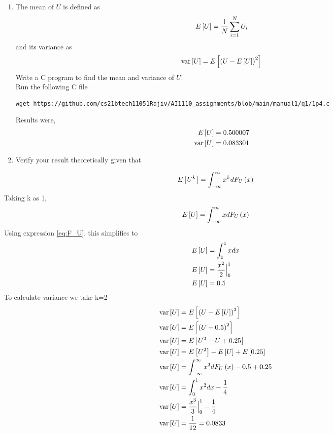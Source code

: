 \documentclass[journal,12pt,twocolumn]{IEEEtran}
\renewcommand\thesection{\arabic{section}}
\begin{document}
\begin{enumerate}[label=\thesection.\arabic*
,ref=\thesection.\theenumi]
\begin{figure}
    \caption{The CDF of $U$}
    \label{fig:theory_uni_cdf}
\end{figure}
%
\item
The mean of $U$ is defined as
%
\begin{equation}
E{}\left[U\right] = \frac{1}{N}\sum_{i=1}^{N}U_i
\end{equation}
%
and its variance as
%
\begin{equation}
    \text{var}{}\left[U\right] = E{}\left[\left(U- E{}\left[U\right]\right)^2\right] \end{equation}
Write a C program to  find the mean and variance of $U$. 
\\
\solution Run the following C file
\begin{lstlisting}
wget https://github.com/cs21btech11051Rajiv/AI1110_assignments/blob/main/manual1/q1/1p4.c
\end{lstlisting}
Results were,
\begin{align}
E{}\left[U\right] = 0.500007 \\
\text{var}{}\left[U\right] = 0.083301 
\end{align}
%
\item Verify your result theoretically given that
\end{enumerate}
%
\begin{align}
    E{}\left[U^k\right] = \int_{-\infty}^{\infty}x^kdF_{U}\left(x\right)
    \label{eq:expectation}
\end{align}
\solution Taking k as 1,
\begin{align}
    E{}\left[U\right] = \int_{-\infty}^{\infty}xdF_{U}\left(x\right)
\end{align}
Using expression \eqref{eq:F_U}, this simplifies to
\begin{align}
    E{}\left[U\right] &= \int_{0}^{1}xdx \\
    E{}\left[U\right] &= \frac{x^2}{2} \Big|_0^1 \\
    E{}\left[U\right] &= 0.5
\end{align}
To calculate variance we take k=2
\begin{align}
    \text{var}{}\left[U\right] &= E{}\left[\left(U- E{}\left[U\right]\right)^2\right] \\
    \text{var}{}\left[U\right] &= E{}\left[\left(U-0.5\right)^2\right] \\
    \text{var}{}\left[U\right] &= E{}\left[U^2 - U + 0.25\right]  \\
    \text{var}{}\left[U\right] &= E{}\left[U^2\right] - E{}\left[U\right] + E{}\left[0.25\right]  \\
    \text{var}{}\left[U\right] &= \int_{-\infty}^{\infty}x^2dF_{U}\left(x\right) - 0.5 + 0.25  \\
    \text{var}{}\left[U\right] &= \int_{0}^{1}x^2dx - \frac{1}{4}  \\   
     \text{var}{}\left[U\right] &= \frac{x^3}{3} \Big|_0^1 - \frac{1}{4}  \\    
     \text{var}{}\left[U\right] &= \frac{1}{12} = 0.0833 \\    
\end{align}
%
\end{document}
